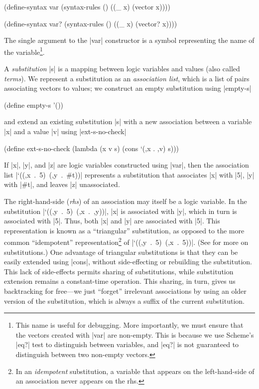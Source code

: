 \schemedisplayspace
\begin{schemedisplay}
(define-syntax var
  (syntax-rules ()
    ((_ x) (vector x))))

(define-syntax var?
  (syntax-rules ()
    ((_ x) (vector? x))))
\end{schemedisplay}

\noindent The single argument to the \scheme|var| constructor is a symbol
representing the name of the variable\footnote{This name is useful for
  debugging.  More importantly, we must ensure that the vectors
  created with \scheme|var| are non-empty. This is because we use
  Scheme's \scheme|eq?| test to distinguish between variables, and
  \scheme|eq?| is not guaranteed to distinguish between two non-empty
  vectors.}.

A \emph{substitution} \scheme|s| is a mapping between logic
variables and values (also called \emph{terms}).  We represent a
substitution as an \emph{association list}, which is a list of pairs
associating vectors to values; we construct an empty substitution using \scheme|empty-s|

\schemedisplayspace
\begin{schemedisplay}
(define empty-s '())
\end{schemedisplay}

\noindent and extend an existing substitution \scheme|s| with a new
association between a variable \scheme|x| and a value \scheme|v| using
\scheme|ext-s-no-check|

\schemedisplayspace
\begin{schemedisplay}
(define ext-s-no-check (lambda (x v s) (cons `(,x . ,v) s)))
\end{schemedisplay}

\noindent If \scheme|x|, \scheme|y|, and \scheme|z| are logic
variables constructed using \scheme|var|, then the association list
\mbox{\scheme|`((,x . 5) (,y . #t))|} represents a substitution that
associates \scheme|x| with \scheme|5|, \scheme|y| with \scheme|#t|,
and leaves \scheme|z| unassociated.

The right-hand-side (\emph{rhs}) of an association may itself be a
logic variable.  In the substitution \mbox{\scheme|`((,y . 5) (,x
  . ,y))|}, \scheme|x| is associated with \scheme|y|, which in turn is
associated with \scheme|5|.  Thus, both \scheme|x| and \scheme|y| are
associated with \scheme|5|.  This representation is known as a
``triangular'' substitution, as opposed to the more common
``idempotent'' representation\footnote{In an \emph{idempotent}
  substitution, a variable that appears on the left-hand-side
  of an association never appears on the rhs.} of \mbox{\scheme|`((,y . 5) (,x . 5))|}.  
(See \citet{FBaade01} for more on substitutions.)
One advantage of triangular substitutions is that they can be easily
extended using \scheme|cons|, without side-effecting or rebuilding the
substitution.  This lack of side-effects permits sharing of
substitutions, while substitution extension remains a constant-time
operation.  This sharing, in turn, gives us backtracking for free---we
just ``forget'' irrelevant associations by using an older version of
the substitution, which is always a suffix of the current
substitution.

